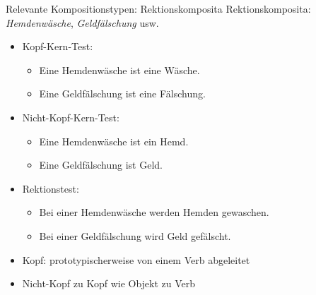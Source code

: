 \begin{frame}
  {Relevante Kompositionstypen: Rektionskomposita}
  \onslide<+->
  Rektionskomposita: \textit{Hemdenwäsche}, \textit{Geldfälschung} usw.
  \Halbzeile
  \begin{itemize}[<+->]
    \item Kopf-Kern-Test:
      \begin{itemize}[<+->]
        \item Eine Hemdenwäsche ist eine Wäsche. \Ck
        \item Eine Geldfälschung ist eine Fälschung. \Ck
      \end{itemize}
    \item Nicht-Kopf-Kern-Test:
      \begin{itemize}[<+->]
        \item Eine Hemdenwäsche ist ein Hemd. \Fl
        \item Eine Geldfälschung ist Geld. \Fl
      \end{itemize}
      \Halbzeile
    \item Rektionstest:
      \begin{itemize}[<+->]
        \item \alert{Bei einer Hemdenwäsche werden Hemden gewaschen. \Ck}
        \item \alert{Bei einer Geldfälschung wird Geld gefälscht. \Ck}
      \end{itemize}
      \Halbzeile
    \item Kopf: prototypischerweise von einem Verb abgeleitet
    \item Nicht-Kopf zu Kopf wie Objekt zu Verb
  \end{itemize}
\end{frame}

